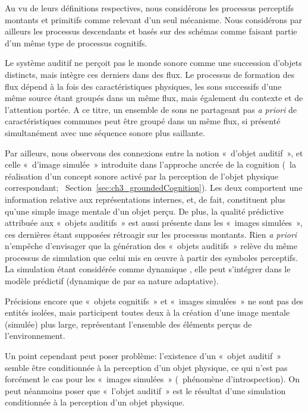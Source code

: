 Au vu de leurs définitions respectives, nous considérons les processus perceptifs montants et primitifs comme relevant d'un seul mécanisme. Nous considérons par ailleurs les processus descendants et basés sur des schémas comme faisant partie d'un même type de processus cognitifs.

Le système auditif ne perçoit pas le monde sonore comme une succession d'objets distincts, mais intègre ces derniers dans des flux. Le processus de formation des flux dépend à la fois des caractéristiques physiques, les sons successifs d'une même source étant groupés dans un même flux, mais également du contexte et de l'attention portée. A ce titre, un ensemble de sons ne partageant pas \emph{a priori} de caractéristiques communes peut être groupé dans un même flux, si présenté simultanément avec une séquence sonore plus saillante.

Par ailleurs, nous observons des connexions entre la notion «~d'objet auditif~», et celle «~d'image simulée~» introduite dans l'approche ancrée de la cognition (\ie~la réalisation d'un concept sonore activé par la perception de l'objet physique correspondant; \cf~Section~\ref{sec:ch3_groundedCognition}). Les deux comportent une information relative aux représentations internes, et, de fait, constituent plus qu'une simple image mentale d'un objet perçu. De plus, la qualité prédictive attribuée aux «~objets auditifs~» est aussi présente dans les «~images simulées~», ces dernières étant supposées rétroagir sur les processus montants. Rien \emph{a priori} n'empêche d'envisager que la génération des «~objets auditifs~» relève du même processus de simulation que celui mis en œuvre à partir des symboles perceptifs. La simulation étant considérée comme dynamique \citep{barsalou1999perceptions}, elle peut s'intégrer dans le modèle prédictif (dynamique de par sa nature adaptative).

Précisions encore que «~objets cognitifs~» et «~images simulées~» ne sont pas des entités isolées, mais participent toutes deux à la création d'une image mentale (simulée) plus large, représentant l'ensemble des éléments perçus de l'environnement.

Un point cependant peut poser problème: l'existence d'un «~objet auditif~» semble être conditionnée à la perception d'un objet physique, ce qui n'est pas forcément le cas pour les «~images simulées~» (\eg~phénomène d'introspection). On peut néanmoins poser que «~l'objet auditif~» est le résultat d'une simulation conditionnée à la perception d'un objet physique.

